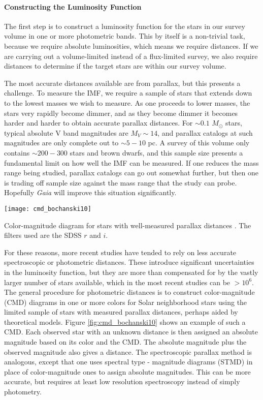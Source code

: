 \paragraph{Constructing the Luminosity Function}

The first step is to construct a luminosity function for the stars in our survey volume in one or more photometric bands. This by itself is a non-trivial task, because we require absolute luminosities, which means we require distances. If we are carrying out a volume-limited instead of a flux-limited survey, we also require distances to determine if the target stars are within our survey volume.

The most accurate distances available are from parallax, but this presents a challenge. To measure the IMF, we require a sample of stars that extends down to the lowest masses we wish to measure. As one proceeds to lower masses, the stars very rapidly become dimmer, and as they become dimmer it becomes harder and harder to obtain accurate parallax distances. For $\sim 0.1$ $M_\odot$ stars, typical absolute V band magnitudes are $M_V \sim 14$, and parallax catalogs at such magnitudes are only complete out to $\sim 5-10$ pc. A survey of this volume only contains $\sim 200-300$ stars and brown dwarfs, and this sample size presents a fundamental limit on how well the IMF can be measured. If one reduces the mass range being studied, parallax catalogs can go out somewhat further, but then one is trading off sample size against the mass range that the study can probe. Hopefully \textit{Gaia} will improve this situation significantly.

\begin{marginfigure}
\texttt{[image: cmd\_bochanski10]}
\caption[Color-magnitude diagram of nearby stars]{
\label{fig:cmd_bochanski10}
Color-magnitude diagram for stars with well-measured parallax distances \citep{bochanski10a}. The filters used are the SDSS $r$ and $i$.
}
\end{marginfigure}

For these reasons, more recent studies have tended to rely on less accurate spectroscopic or photometric distances. These introduce significant uncertainties in the luminosity function, but they are more than compensated for by the vastly larger number of stars available, which in the most recent studies can be $>10^6$. The general procedure for photometric distances is to construct color-magnitude (CMD) diagrams in one or more colors for Solar neighborhood stars using the limited sample of stars with measured parallax distances, perhaps aided by theoretical models. Figure \ref{fig:cmd_bochanski10} shows an example of such a CMD. Each observed star with an unknown distance is then assigned an absolute magnitude based on its color and the CMD. The absolute magnitude plus the observed magnitude also gives a distance. The spectroscopic parallax method is analogous, except that one uses spectral type - magnitude diagrams (STMD) in place of color-magnitude ones to assign absolute magnitudes. This can be more accurate, but requires at least low resolution spectroscopy instead of simply photometry.

